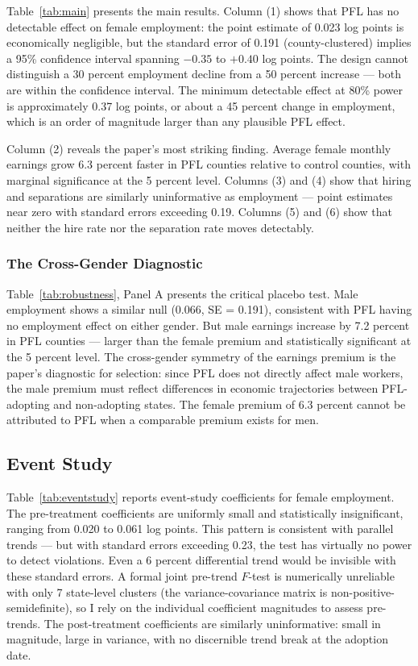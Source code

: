 \documentclass[12pt]{article}
\begin{document}
Table~\ref{tab:main} presents the main results. Column (1) shows that PFL has no detectable effect on female employment: the point estimate of 0.023 log points is economically negligible, but the standard error of 0.191 (county-clustered) implies a 95\% confidence interval spanning $-0.35$ to $+0.40$ log points. The design cannot distinguish a 30 percent employment decline from a 50 percent increase --- both are within the confidence interval. The minimum detectable effect at 80\% power is approximately 0.37 log points, or about a 45 percent change in employment, which is an order of magnitude larger than any plausible PFL effect.

Column (2) reveals the paper's most striking finding. Average female monthly earnings grow 6.3 percent faster in PFL counties relative to control counties, with marginal significance at the 5 percent level. Columns (3) and (4) show that hiring and separations are similarly uninformative as employment --- point estimates near zero with standard errors exceeding 0.19. Columns (5) and (6) show that neither the hire rate nor the separation rate moves detectably.

\subsubsection*{The Cross-Gender Diagnostic} Table~\ref{tab:robustness}, Panel A presents the critical placebo test. Male employment shows a similar null (0.066, SE = 0.191), consistent with PFL having no employment effect on either gender. But male earnings increase by 7.2 percent in PFL counties --- larger than the female premium and statistically significant at the 5 percent level. The cross-gender symmetry of the earnings premium is the paper's diagnostic for selection: since PFL does not directly affect male workers, the male premium must reflect differences in economic trajectories between PFL-adopting and non-adopting states. The female premium of 6.3 percent cannot be attributed to PFL when a comparable premium exists for men.


\subsection{Event Study}



Table~\ref{tab:eventstudy} reports event-study coefficients for female employment. The pre-treatment coefficients are uniformly small and statistically insignificant, ranging from 0.020 to 0.061 log points. This pattern is consistent with parallel trends --- but with standard errors exceeding 0.23, the test has virtually no power to detect violations. Even a 6 percent differential trend would be invisible with these standard errors. A formal joint pre-trend $F$-test is numerically unreliable with only 7 state-level clusters (the variance-covariance matrix is non-positive-semidefinite), so I rely on the individual coefficient magnitudes to assess pre-trends. The post-treatment coefficients are similarly uninformative: small in magnitude, large in variance, with no discernible trend break at the adoption date.
\end{document}

